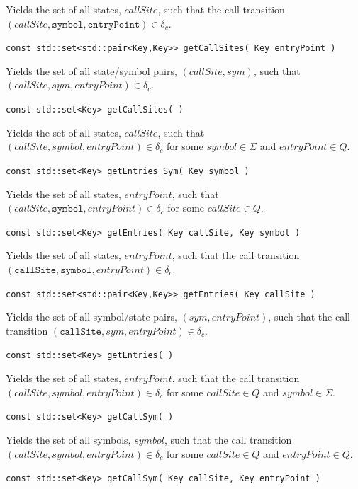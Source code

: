 \documentclass{llncs}
\begin{document}
\begin{description}
    Yields the set of all states, $callSite$, such that the call transition $(callSite,\texttt{symbol},\texttt{entryPoint}) \in \delta_c$.

  \item\texttt{const std::set<std::pair<Key,Key>> getCallSites( Key entryPoint )}

    Yields the set of all state/symbol pairs, $(callSite,sym)$, such that $(callSite,sym,entryPoint) \in \delta_c$. 

  \item\texttt{const std::set<Key> getCallSites( )}

    Yields the set of all states, $callSite$, such that $(callSite,symbol,entryPoint) \in \delta_c$ for some $symbol \in \Sigma$ and $entryPoint \in Q$.

  \item\texttt{const std::set<Key> getEntries\_Sym( Key symbol )}

    Yields the set of all states, $entryPoint$, such that $(callSite,\texttt{symbol},entryPoint) \in \delta_c$ for some $callSite \in Q$.

  \item\texttt{const std::set<Key> getEntries( Key callSite, Key symbol )}

    Yields the set of all states, $entryPoint$, such that the call transition $(\texttt{callSite},\texttt{symbol},entryPoint) \in \delta_c$.

  \item\texttt{const std::set<std::pair<Key,Key>> getEntries( Key callSite )}

    Yields the set of all symbol/state pairs, $(sym,entryPoint)$, such that the call transition $(\texttt{callSite},sym,entryPoint) \in \delta_c$.

  \item\texttt{const std::set<Key> getEntries( )}

    Yields the set of all states, $entryPoint$, such that the call transition $(callSite,symbol,entryPoint) \in \delta_c$ for some $callSite \in Q$ and $symbol \in \Sigma$.

  \item\texttt{const std::set<Key> getCallSym( )}

    Yields the set of all symbols, $symbol$, such that the call transition $(callSite,symbol,entryPoint) \in \delta_c$ for some $callSite \in Q$ and $entryPoint \in Q$.

  \item\texttt{const std::set<Key> getCallSym( Key callSite, Key entryPoint )}


\end{description}
\end{document}
